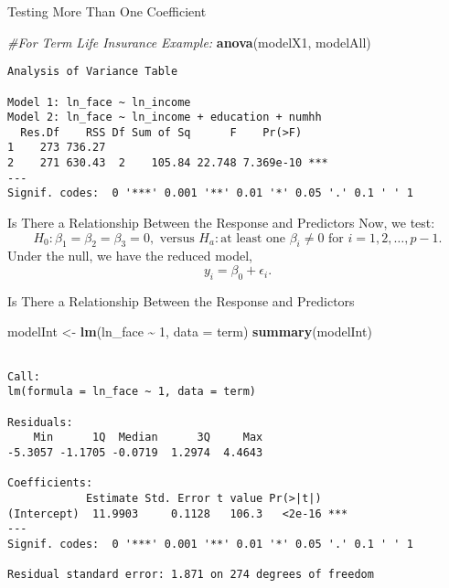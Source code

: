 \documentclass[
  ignorenonframetext,
]{beamer}
\newenvironment{Shaded}{\begin{snugshade}}{\end{snugshade}}
\newcommand{\AttributeTok}[1]{\textcolor[rgb]{0.13,0.29,0.53}{#1}}
\newcommand{\CommentTok}[1]{\textcolor[rgb]{0.56,0.35,0.01}{\textit{#1}}}
\newcommand{\DecValTok}[1]{\textcolor[rgb]{0.00,0.00,0.81}{#1}}
\newcommand{\FunctionTok}[1]{\textcolor[rgb]{0.13,0.29,0.53}{\textbf{#1}}}
\newcommand{\NormalTok}[1]{#1}
\newcommand{\OtherTok}[1]{\textcolor[rgb]{0.56,0.35,0.01}{#1}}
\newcommand{\SpecialCharTok}[1]{\textcolor[rgb]{0.81,0.36,0.00}{\textbf{#1}}}
\begin{document}
\begin{frame}[fragile]{Testing More Than One Coefficient}
\protect\hypertarget{testing-more-than-one-coefficient-1}{}
\normalsize

\begin{Shaded}
\begin{Highlighting}[]
\CommentTok{\#For Term Life Insurance Example:}
\FunctionTok{anova}\NormalTok{(modelX1, modelAll)}
\end{Highlighting}
\end{Shaded}

\begin{verbatim}
Analysis of Variance Table

Model 1: ln_face ~ ln_income
Model 2: ln_face ~ ln_income + education + numhh
  Res.Df    RSS Df Sum of Sq      F    Pr(>F)    
1    273 736.27                                  
2    271 630.43  2    105.84 22.748 7.369e-10 ***
---
Signif. codes:  0 '***' 0.001 '**' 0.01 '*' 0.05 '.' 0.1 ' ' 1
\end{verbatim}

\normalsize
\end{frame}

\begin{frame}{Is There a Relationship Between the Response and
Predictors}
\protect\hypertarget{is-there-a-relationship-between-the-response-and-predictors}{}
Now, we test:
\[H_0:\beta_1=\beta_2=\beta_3=0, \text{ versus } H_a: \text{at least one } \beta_i \neq 0 \text{ for } i = 1, 2, \ldots, p-1.\]
Under the null, we have the reduced model, \[y_i=\beta_0+\epsilon_i.\]
\end{frame}

\begin{frame}[fragile]{Is There a Relationship Between the Response and
Predictors}
\protect\hypertarget{is-there-a-relationship-between-the-response-and-predictors-1}{}
\normalsize

\begin{Shaded}
\begin{Highlighting}[]
\NormalTok{modelInt }\OtherTok{\textless{}{-}} \FunctionTok{lm}\NormalTok{(ln\_face }\SpecialCharTok{\textasciitilde{}} \DecValTok{1}\NormalTok{, }\AttributeTok{data =}\NormalTok{ term)}
\FunctionTok{summary}\NormalTok{(modelInt)}
\end{Highlighting}
\end{Shaded}

\begin{verbatim}

Call:
lm(formula = ln_face ~ 1, data = term)

Residuals:
    Min      1Q  Median      3Q     Max 
-5.3057 -1.1705 -0.0719  1.2974  4.4643 

Coefficients:
            Estimate Std. Error t value Pr(>|t|)    
(Intercept)  11.9903     0.1128   106.3   <2e-16 ***
---
Signif. codes:  0 '***' 0.001 '**' 0.01 '*' 0.05 '.' 0.1 ' ' 1

Residual standard error: 1.871 on 274 degrees of freedom
\end{verbatim}

\normalsize
\end{frame}
\end{document}
